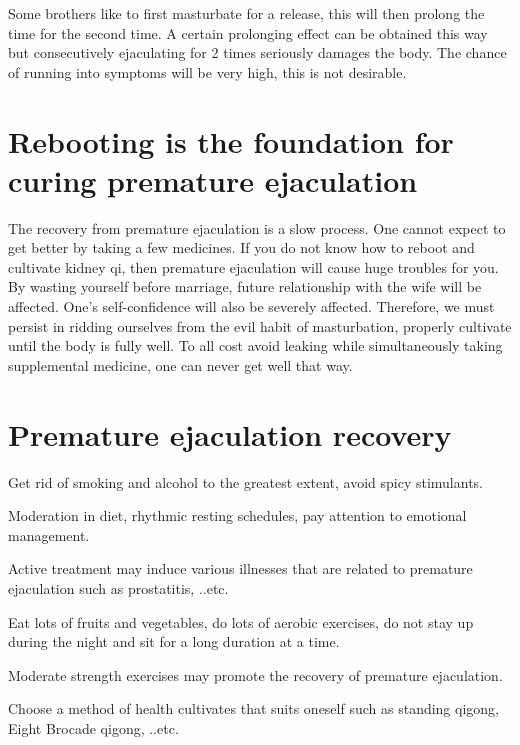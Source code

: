 \documentclass[
]{book}
\begin{document}
Some brothers like to first masturbate for a release, this will then prolong the time for the second time. A certain prolonging effect can be obtained this way but consecutively ejaculating for 2 times seriously damages the body. The chance of running into symptoms will be very high, this is not desirable.

\hypertarget{rebooting-is-the-foundation-for-curing-premature-ejaculation}{%
\section{Rebooting is the foundation for curing premature ejaculation}\label{rebooting-is-the-foundation-for-curing-premature-ejaculation}}

The recovery from premature ejaculation is a slow process. One cannot expect to get better by taking a few medicines. If you do not know how to reboot and cultivate kidney qi, then premature ejaculation will cause huge troubles for you. By wasting yourself before marriage, future relationship with the wife will be affected. One's self-confidence will also be severely affected. Therefore, we must persist in ridding ourselves from the evil habit of masturbation, properly cultivate until the body is fully well. To all cost avoid leaking while simultaneously taking supplemental medicine, one can never get well that way.

\hypertarget{premature-ejaculation-recovery}{%
\section{Premature ejaculation recovery}\label{premature-ejaculation-recovery}}

Get rid of smoking and alcohol to the greatest extent, avoid spicy stimulants.

Moderation in diet, rhythmic resting schedules, pay attention to emotional management.

Active treatment may induce various illnesses that are related to premature ejaculation such as prostatitis, ..etc.

Eat lots of fruits and vegetables, do lots of aerobic exercises, do not stay up during the night and sit for a long duration at a time.

Moderate strength exercises may promote the recovery of premature ejaculation.

Choose a method of health cultivates that suits oneself such as standing qigong, Eight Brocade qigong, ..etc.
\end{document}
